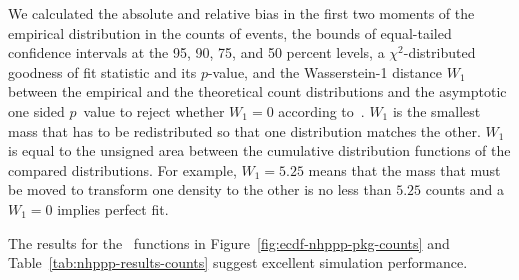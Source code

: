 \documentclass[article]{jss}\usepackage[]{graphicx}\usepackage[]{xcolor}
\begin{document}
We calculated the absolute and relative bias in the first two moments of the empirical distribution in the counts of events, the bounds of equal-tailed confidence intervals at the 95, 90, 75, and 50 percent levels, a $\chi^2$-distributed goodness of fit statistic and its $p$-value, and the Wasserstein-1 distance $W_1$ between the empirical and the theoretical count distributions and the asymptotic one sided $p$~value to reject whether $W_1 = 0$ according to~\citet{sommerfeld2018inference}. $W_1$ is the smallest mass that has to be redistributed so that one distribution matches the other. $W_1$ is equal to the unsigned area between the cumulative distribution functions of the compared distributions. For example, $W_1 = 5.25$ means that the mass that must be moved to transform one density to the other is no less than $5.25$ counts and a $W_1 = 0$ implies perfect fit.





The results for the~ functions in Figure~\ref{fig:ecdf-nhppp-pkg-counts} and Table~\ref{tab:nhppp-results-counts} suggest excellent simulation performance.
\end{document}
